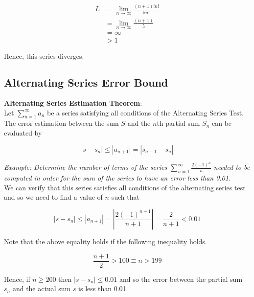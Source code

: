         \begin{align*}
            L   &= \lim_{n\to\infty}\frac{(n+1)!n!}{5n!} \\
                &= \lim_{n\to\infty}\frac{(n+1)}{5} \\
                &= \infty \\
                &> 1
        \end{align*}

        \noindent Hence, this series diverges.


    \subsection{Alternating Series Error Bound}
        \color{purple} \textbf{Alternating Series Estimation Theorem}: \color{black} \\
        \noindent Let $\sum^\infty_{n=1}a_n$ be a series satisfying all conditions of the
        Alternating Series Test. The error estimation between the sum $S$ and the $n$th partial sum
        $S_n$ can be evaluated by

        \begin{equation*}
            |s-s_n|\leq|a_{n+1}|=|s_{n+1}-s_n|
        \end{equation*}

        \noindent \color{blue} \textit{Example: Determine the number of terms of the series
        $\sum^\infty_{n=1}\frac{2(-1)^n}{n}$ needed to be computed in order for the sum of the series
        to have an error less than 0.01.} \color{black} \\

        \noindent We can verify that this series satisfies all conditions of the alternating series
        test and so we need to find a value of $n$ such that

        \begin{equation*}
            |s-s_n|\leq|a_{n+1}|=\left|\frac{2(-1)^{n+1}}{n+1}\right|=\frac{2}{n+1}<0.01
        \end{equation*}

        \noindent Note that the above equality holds if the following inequality holds.

        \begin{equation*}
            \frac{n+1}{2} > 100\equiv n>199
        \end{equation*}

        \noindent Hence, if $n\geq 200$ then $|s-s_n|\leq0.01$ and so the error between the partial
        sum $s_n$ and the actual sum $s$ is less than 0.01.


